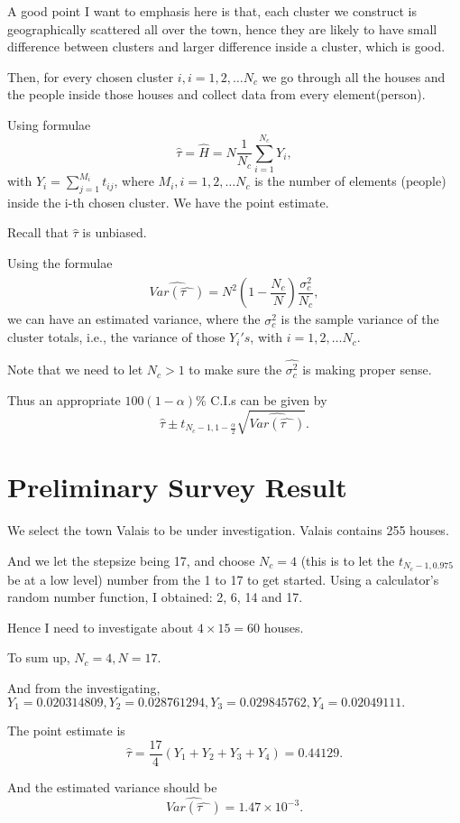 \documentclass[12pt]{article}%
\begin{document}
A good point I want to emphasis here is that, each cluster we construct is geographically scattered all over the town, hence they are likely to have small difference between clusters and larger difference inside a cluster, which is good.

Then, for every chosen cluster $i, i=1,2,\dots N_c$ we go through all the houses and the people inside those houses and collect data from every element(person).

Using formulae $$\hat{\tau}=\hat{H}=N\frac{1}{N_c}\sum_{i=1}^{N_c}Y_i,$$ with $Y_i=\sum_{j=1}^{M_i}t_{ij}$, where $M_i, i=1,2,\dots N_c$ is the number of elements (people) inside the i-th chosen cluster. We have the point estimate.

Recall that $\hat{\tau}$ is unbiased.

Using the formulae 
$$\hat{Var(\hat{\tau~~~})  }=N^2(1-\frac{N_c}{N})\frac{\hat{\sigma_{c}^2}}{N_c},$$ we can have an estimated variance, where the $\hat{\sigma_{c}^2}$ is the sample variance of the cluster totals, i.e., the variance of those $Y_i's$, with $i=1,2,\dots N_c.$

Note that we need to let $N_c>1$ to make sure the $\hat{\sigma_{c}^2}$ is making proper sense.

Thus an appropriate $100(1-\alpha)\%$ C.I.s can be given by $$\hat{\tau} \pm t_{N_c-1,1-\frac{\alpha}{2}}\sqrt{\hat{Var(\hat{\tau~~~})  }}.$$



\section{Preliminary Survey Result}

We select the town Valais to be under investigation. Valais contains 255 houses.

And we let the stepsize being 17, and choose $N_c=4$ (this is to let the $t_{N_c-1,0.975}$ be at a low level) number from the 1 to 17 to get started.
Using a calculator's random number function, I obtained: 2, 6, 14 and 17.

Hence I need to investigate about $4 \times 15=60$ houses.

To sum up, $N_c=4, N=17.$ 

And from the investigating, $Y_1=0.020314809, Y_2=0.028761294, Y_3=0.029845762, Y_4=0.02049111.$ 

The point estimate is $$\hat{\tau}=\frac{17}{4}(Y_1+Y_2+Y_3+Y_4)=0.44129.$$

And the estimated variance should be $$\hat{Var(\hat{\tau~~~})  }=1.47\times 10^{-3}.$$
\end{document}
